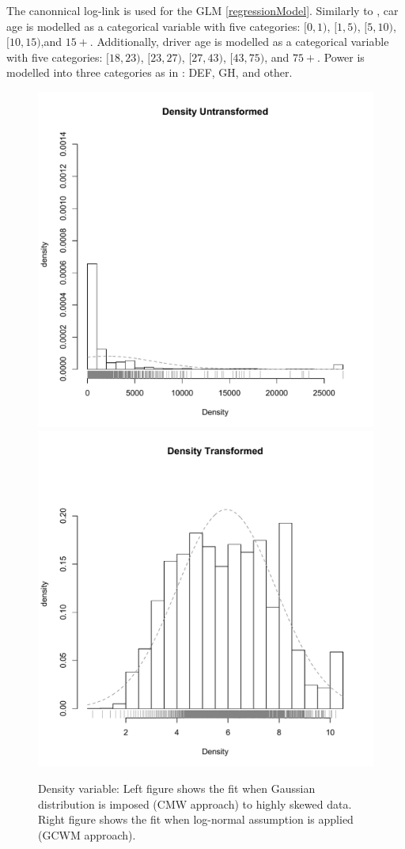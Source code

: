 \documentclass[11pt,letterpaper]{article}
\numberwithin{equation}{section}
\numberwithin{equation}{section}
\numberwithin{equation}{section}
\begin{document}
The canonnical log-link is used for the GLM \eqref{regressionModel}. Similarly to \cite{risks_miljkovic},
car age is modelled as a categorical variable with five categories: $[0,1)$, $[1,5)$, $[5,10)$, $[10,15)$,and $15+$. Additionally, driver age is modelled as a categorical variable with five categories: $[18,23)$, $[23,27)$, $[27,43)$, $[43,75)$, and $75+$. Power is modelled into three categories as in \cite{Charpentier:2014}:
DEF, GH, and other.
\begin{figure}[!htb]
\begin{center}
\caption{Density variable: Left figure shows the fit when Gaussian distribution is imposed (CMW approach) to highly skewed data. Right figure shows the fit when log-normal assumption is applied (GCWM approach).}
\includegraphics[scale=0.40]{Density.pdf}
\includegraphics[scale=0.40]{logDensity.pdf}

\end{center}
\end{figure}
\end{document}
